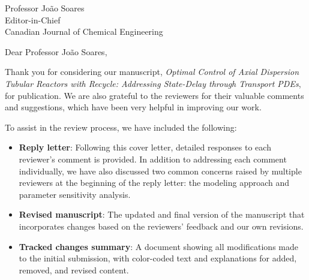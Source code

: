 \documentclass[12pt]{letter}
\begin{document}
\date{November 20, 2024}

\begin{letter}{Professor João Soares \\
Editor-in-Chief \\
Canadian Journal of Chemical Engineering}

\opening{Dear Professor João Soares,}

Thank you for considering our manuscript, \textit{Optimal Control of Axial Dispersion Tubular Reactors with Recycle: Addressing State-Delay through Transport PDEs}, for publication. We are also grateful to the reviewers for their valuable comments and suggestions, which have been very helpful in improving our work.

To assist in the review process, we have included the following:
\begin{itemize}
    \item \textbf{Reply letter}: Following this cover letter, detailed responses to each reviewer’s comment is provided. In addition to addressing each comment individually, we have also discussed two common concerns raised by multiple reviewers at the beginning of the reply letter: the modeling approach and parameter sensitivity analysis.
    \item \textbf{Revised manuscript}: The updated and final version of the manuscript that incorporates changes based on the reviewers' feedback and our own revisions.
    \item \textbf{Tracked changes summary}: A document showing all modifications made to the initial submission, with color-coded text and explanations for added, removed, and revised content.
\end{itemize}

    



\end{letter}
\end{document}
